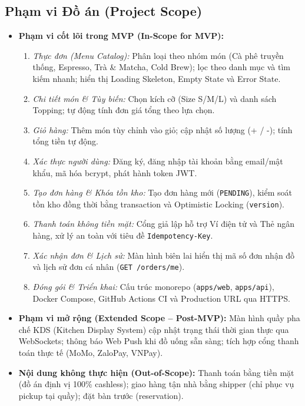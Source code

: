 \documentclass[a4paper]{article}
\begin{document}
\subsection{Phạm vi Đồ án (Project Scope)}
\begin{itemize}
    \item \textbf{Phạm vi cốt lõi trong MVP (In-Scope for MVP):}
    \begin{enumerate}
        \item \textit{Thực đơn (Menu Catalog):} Phân loại theo nhóm món (Cà phê truyền thống, Espresso, Trà \& Matcha, Cold Brew); lọc theo danh mục và tìm kiếm nhanh; hiển thị Loading Skeleton, Empty State và Error State.
        \item \textit{Chi tiết món \& Tùy biến:} Chọn kích cỡ (Size S/M/L) và danh sách Topping; tự động tính đơn giá tổng theo lựa chọn.
        \item \textit{Giỏ hàng:} Thêm món tùy chỉnh vào giỏ; cập nhật số lượng (+ / -); tính tổng tiền tự động.
        \item \textit{Xác thực người dùng:} Đăng ký, đăng nhập tài khoản bằng email/mật khẩu, mã hóa bcrypt, phát hành token JWT.
        \item \textit{Tạo đơn hàng \& Khóa tồn kho:} Tạo đơn hàng mới (\texttt{PENDING}), kiểm soát tồn kho đồng thời bằng transaction và Optimistic Locking (\texttt{version}).
        \item \textit{Thanh toán không tiền mặt:} Cổng giả lập hỗ trợ Ví điện tử và Thẻ ngân hàng, xử lý an toàn với tiêu đề \texttt{Idempotency-Key}.
        \item \textit{Xác nhận đơn \& Lịch sử:} Màn hình biên lai hiển thị mã số đơn nhận đồ và lịch sử đơn cá nhân (\texttt{GET /orders/me}).
        \item \textit{Đóng gói \& Triển khai:} Cấu trúc monorepo (\nolinkurl{apps/web}, \nolinkurl{apps/api}), Docker Compose, GitHub Actions CI và Production URL qua HTTPS.
    \end{enumerate}
    
    \item \textbf{Phạm vi mở rộng (Extended Scope -- Post-MVP):} Màn hình quầy pha chế KDS (Kitchen Display System) cập nhật trạng thái thời gian thực qua WebSockets; thông báo Web Push khi đồ uống sẵn sàng; tích hợp cổng thanh toán thực tế (MoMo, ZaloPay, VNPay).
    
    \item \textbf{Nội dung không thực hiện (Out-of-Scope):} Thanh toán bằng tiền mặt (đồ án định vị 100\% cashless); giao hàng tận nhà bằng shipper (chỉ phục vụ pickup tại quầy); đặt bàn trước (reservation).
\end{itemize}
\end{document}
